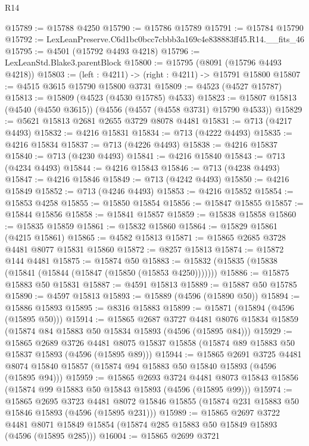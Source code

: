 \begin{lexlean}{R14}
\begin{coremodule}
@15789 := @15788 @4250
@15790 := @15786 @15789
@15791 := @15784 @15790
@15792 := LexLeanPreserve.C6d1bc0bcc7cbbb3a169c4e838883ff45.R14.__fits_46
@15795 := @4501 (@15792 @4493 @4218)
@15796 := LexLeanStd.Blake3.parentBlock
@15800 := @15795 (@8091 (@15796 @4493 @4218))
@15803 := (left : @4211) -> (right : @4211) -> @15791 @15800
@15807 := @4515 @3615 @15790 @15800 @3731
@15809 := @4523 (@4527 @15787)
@15813 := @15809 (@4523 (@4530 @15785) @4533)
@15823 := @15807 @15813 (@4540 (@4550 @3615)) (@4556 (@4557 (@4558 @3731) @15790 @4533))
@15829 := @5621 @15813 @2681 @2655 @3729 @8078 @4481
@15831 := @713 (@4217 @4493)
@15832 := @4216 @15831
@15834 := @713 (@4222 @4493)
@15835 := @4216 @15834
@15837 := @713 (@4226 @4493)
@15838 := @4216 @15837
@15840 := @713 (@4230 @4493)
@15841 := @4216 @15840
@15843 := @713 (@4234 @4493)
@15844 := @4216 @15843
@15846 := @713 (@4238 @4493)
@15847 := @4216 @15846
@15849 := @713 (@4242 @4493)
@15850 := @4216 @15849
@15852 := @713 (@4246 @4493)
@15853 := @4216 @15852
@15854 := @15853 @4258
@15855 := @15850 @15854
@15856 := @15847 @15855
@15857 := @15844 @15856
@15858 := @15841 @15857
@15859 := @15838 @15858
@15860 := @15835 @15859
@15861 := @15832 @15860
@15864 := @15829 @15861 (@4215 @15861)
@15865 := @4582 @15813
@15871 := @15865 @2685 @3728 @4481 @8077 @15831 @15860
@15872 := @8257 @15813
@15874 := @15872 @144 @4481
@15875 := @15874 @50
@15883 := @15832 (@15835 (@15838 (@15841 (@15844 (@15847 (@15850 (@15853 @4250)))))))
@15886 := @15875 @15883 @50 @15831
@15887 := @4591 @15813
@15889 := @15887 @50 @15785
@15890 := @4597 @15813
@15893 := @15889 (@4596 (@15890 @50))
@15894 := @15886 @15893
@15895 := @8316 @15883
@15899 := @15871 (@15894 (@4596 (@15895 @50)))
@15914 := @15865
    @2687
    @3727
    @4481
    @8076
    @15834
    @15859
    (@15874 @84 @15883 @50 @15834 @15893 (@4596 (@15895 @84)))
@15929 := @15865
    @2689
    @3726
    @4481
    @8075
    @15837
    @15858
    (@15874 @89 @15883 @50 @15837 @15893 (@4596 (@15895 @89)))
@15944 := @15865
    @2691
    @3725
    @4481
    @8074
    @15840
    @15857
    (@15874 @94 @15883 @50 @15840 @15893 (@4596 (@15895 @94)))
@15959 := @15865
    @2693
    @3724
    @4481
    @8073
    @15843
    @15856
    (@15874 @99 @15883 @50 @15843 @15893 (@4596 (@15895 @99)))
@15974 := @15865
    @2695
    @3723
    @4481
    @8072
    @15846
    @15855
    (@15874 @231 @15883 @50 @15846 @15893 (@4596 (@15895 @231)))
@15989 := @15865
    @2697
    @3722
    @4481
    @8071
    @15849
    @15854
    (@15874 @285 @15883 @50 @15849 @15893 (@4596 (@15895 @285)))
@16004 := @15865
    @2699
    @3721

\end{coremodule}
\end{lexlean}

